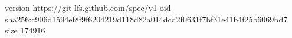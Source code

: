 version https://git-lfs.github.com/spec/v1
oid sha256:c906d1594ef8f9f6204219d118d82a014dcd2f0631f7bf31e41b4f25b6069bd7
size 174916
